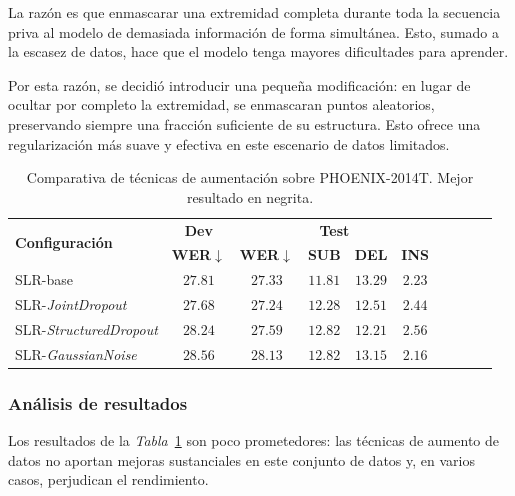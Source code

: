 La razón es que enmascarar una extremidad completa durante toda la secuencia priva al modelo de demasiada información de forma simultánea.
Esto, sumado a la escasez de datos, hace que el modelo tenga mayores dificultades para aprender.

Por esta razón, se decidió introducir una pequeña modificación: en lugar de ocultar por completo la extremidad, se enmascaran puntos aleatorios, preservando siempre una fracción suficiente de su estructura.
Esto ofrece una regularización más suave y efectiva en este escenario de datos limitados.

\begin{table}[H]
	\centering
	\begin{tabular}{lc|cccc|cccc}
		\hline
		\multirow{2}{*}{\textbf{Configuración}}
		    & \multicolumn{1}{c|}{\textbf{Dev}}
		    & \multicolumn{4}{c}{\textbf{Test}}  \\
		    & \textbf{WER}$\downarrow$
		    & \textbf{WER}$\downarrow$
		    & \textbf{SUB} & \textbf{DEL} & \textbf{INS} \\ \hline
		SLR-base                                    & $27.81$ & $27.33$          & $11.81$ & $13.29$ & $2.23$ \\
		SLR-\textit{JointDropout}                   & $\mathbf{27.68}$ & $\mathbf{27.24}$ & $12.28$ & $12.51$ & $2.44$ \\
		SLR-\textit{StructuredDropout}              & $28.24$ & $27.59$          & $12.82$ & $12.21$ & $2.56$ \\
		SLR-\textit{GaussianNoise}                  & $28.56$ & $28.13$          & $12.82$ & $13.15$ & $2.16$ \\ \hline
	\end{tabular}
	\caption{Comparativa de técnicas de aumentación sobre PHOENIX-2014T\@.
	Mejor resultado en negrita.}
	\label{tab:slr_augmentation}
\end{table}

\subsubsection*{Análisis de resultados}

Los resultados de la \textit{Tabla}~\ref{tab:slr_augmentation} son poco prometedores: las técnicas de aumento de datos no aportan mejoras sustanciales en este conjunto de datos y, en varios casos, perjudican el rendimiento.

